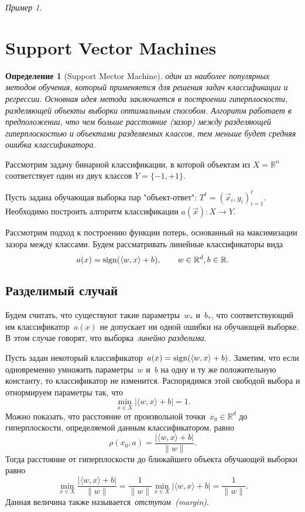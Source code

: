\documentclass[a4paper, 12pt]{article}
\newcommand{\sign}{\mathop{\rm sign}\limits}
\def\RR{\mathbb{R}}
\theoremstyle{plain} %
\newtheorem{definition}{Определение}
\theoremstyle{definition} %
\theoremstyle{remark} %
\newtheorem{example}{Пример}
\begin{document}
\begin{example}
\section{Support Vector Machines}

\begin{definition}[Support Mector Machine]
	один из наиболее популярных методов обучения, который применяется для решения задач классификации и регрессии. Основная идея метода заключается в построении гиперплоскости, разделяющей объекты выборки оптимальным способом. Алгоритм работает в предположении, что чем больше расстояние (зазор) между разделяющей гиперплоскостью и объектами разделяемых классов, тем меньше будет средняя ошибка классификатора.
\end{definition}

Рассмотрим задачу бинарной классификации, в которой объектам из $X=\mathbb{R}^n$ соответствует один из двух классов $Y = \{-1, +1\}$.

Пусть задана обучающая выборка пар "объект-ответ": $T^\ell = (\vec{x}_i, y_i)_{i=1}^\ell$. Необходимо построить алгоритм классификации $a(\vec{x}) : X \to Y$.

Рассмотрим подход к построению функции потерь,
основанный на максимизации зазора между классами.
Будем рассматривать линейные классификаторы вида
\[
    a(x) = \sign (\langle w, x \rangle + b), \qquad w \in \RR^d, b \in \RR.
\]

\subsection{Разделимый случай}
Будем считать, что существуют такие параметры~$w_*$ и~$b_*$,
что соответствующий им классификатор~$a(x)$ не допускает ни одной ошибки
на обучающей выборке.
В этом случае говорят, что выборка~\emph{линейно разделима}.

Пусть задан некоторый классификатор~$a(x) = \sign (\langle w, x \rangle + b)$.
Заметим, что если одновременно умножить параметры~$w$ и~$b$
на одну и ту же положительную константу,
то классификатор не изменится.
Распорядимся этой свободой выбора и отнормируем параметры так, что
\begin{equation}
\label{eq:svmNormCond}
    \min_{x \in X} | \langle w, x \rangle + b| = 1.
\end{equation}
Можно показать, что расстояние от произвольной точки~$x_0 \in \RR^d$ до гиперплоскости,
определяемой данным классификатором, равно
\[
    \rho(x_0, a)
    =
    \frac{
        |\langle w, x \rangle + b|
    }{
        \|w\|
    }.
\]
Тогда расстояние от гиперплоскости до ближайшего объекта обучающей выборки равно
\[
    \min_{x \in X}
    \frac{
        |\langle w, x \rangle + b|
    }{
        \|w\|
    }
    =
    \frac{1}{\|w\|} \min_{x \in X} |\langle w, x \rangle + b|
    =
    \frac{1}{\|w\|}.
\]
Данная величина также называется~\emph{отступом~(margin)}.


\end{example}
\end{document}
